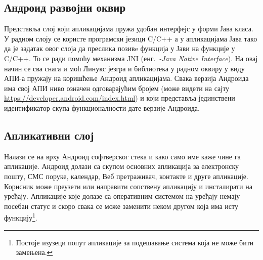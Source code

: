 \documentclass[12pt,oneside]{memoir}
\theoremstyle{remark}
\begin{document}
\subsection{Андроид развојни оквир}
Представља слој који апликацијама пружа удобан интерфејс у форми Јава класа. У радном слоју се користе програмски језици C/C++ а у апликацијама Јава тако да је задатак овог слоја да преслика позивe функција у Јави на функције у C/C++. То се ради помоћу механизма JNI (енг.~{\em -Java Native Interface}). На овај начин се сва снага и моћ Линукс језгра и библиотека у радном оквиру у виду АПИ-а пружају на коришћење Андроид апликацијама. Свака верзија Андроида има свој АПИ ниво означен одговарајућим бројем (може видети на сајту \url{https://developer.android.com/index.html}) и који представља јединствени идентификатор скупа функционалности дате верзије Андроида.

\subsection{Апликативни слој}
Налази се на врху Андроид софтверског стека и како само име каже чине га апликације. Андроид долази са скупом основних апликација за електронску пошту, СМС поруке, календар, Веб претраживач, контакте и друге апликације. Корисник може преузети или направити сопствену апликацију и инсталирати на уређају. Апликације које долазе са оперативним системом на уређају немају посебан статус и скоро свака се може заменити неком другом која има исту функцију\footnote{Постоје изузеци попут апликације за подешавање система која не може бити замењена.}.
\end{document}
